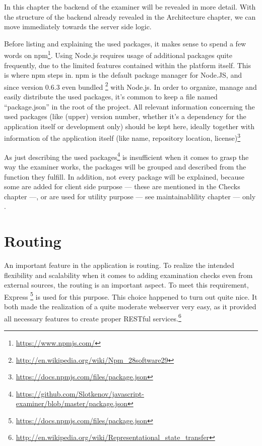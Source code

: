 In this chapter the backend of the \gls{examiner} will be revealed in more 
detail. With the structure of the backend already revealed in the Architecture 
chapter, we can move immediately towards the server side logic.

Before listing and explaining the used packages, it makes sense to spend a few 
words on npm\footnote{\url{https://www.npmjs.com/}}. Using Node.js requires
usage of additional packages quite frequently, due to the limited
features contained within the platform itself. This is where npm steps in. npm
is the default package manager for Node.JS, and since version 0.6.3 even bundled
\footnote{\url{http://en.wikipedia.org/wiki/Npm_28software29}} with Node.js.
In order to organize, manage and easily distribute the used packages, it's
common to keep a file named ``package.json'' in the root of the project. All 
relevant information concerning the used packages (like (upper) version number,
whether it's a dependency for the application itself or development only) should 
be kept here, ideally together with information of the application 
itself (like name, repository location,
license)\footnote{\url{https://docs.npmjs.com/files/package.json}}

As just describing the used 
packages\footnote{\url{https://github.com/Slotkenov/javascript-examiner/blob/master/package.json}}
is insufficient when it comes to grasp the way the \gls{examiner} works, the 
packages will be grouped and described from the function they fulfill. In
addition, not every package will be explained, because some are added for client
side purpose --- these are mentioned in the Checks chapter ---, 
or are used for utility purpose --- see maintainablility chapter --- only .

\section{Routing}
An important feature in the application is routing. To realize the intended
flexibility and scalability when it comes to adding examination checks even from
external sources, the routing is an important aspect. To meet this requirement,
Express \footnote{\url{https://docs.npmjs.com/files/package.json}} is used for
this purpose. This choice happened to turn out quite nice. It both made the
realization of a quite moderate webserver very easy, as it provided all
necessary features to create proper RESTful
services.\footnote{\url{http://en.wikipedia.org/wiki/Representational_state_transfer}}

